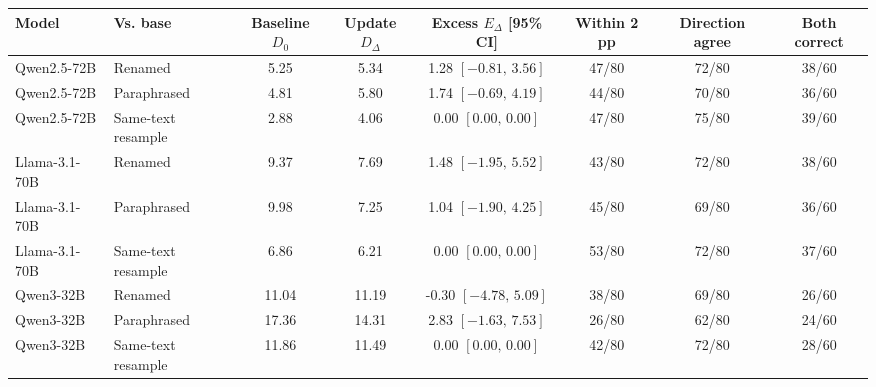 \begin{tabular}{@{}llcccccc@{}}
\toprule
Model & Vs. base & Baseline $D_0$ & Update $D_\Delta$ & Excess $E_\Delta$ [95\% CI] & Within 2 pp & Direction agree & Both correct \\
\midrule
Qwen2.5-72B & Renamed & 5.25 & 5.34 & 1.28 $[-0.81,\,3.56]$ & 47/80 & 72/80 & 38/60 \\
Qwen2.5-72B & Paraphrased & 4.81 & 5.80 & 1.74 $[-0.69,\,4.19]$ & 44/80 & 70/80 & 36/60 \\
Qwen2.5-72B & Same-text resample & 2.88 & 4.06 & 0.00 $[0.00,\,0.00]$ & 47/80 & 75/80 & 39/60 \\
Llama-3.1-70B & Renamed & 9.37 & 7.69 & 1.48 $[-1.95,\,5.52]$ & 43/80 & 72/80 & 38/60 \\
Llama-3.1-70B & Paraphrased & 9.98 & 7.25 & 1.04 $[-1.90,\,4.25]$ & 45/80 & 69/80 & 36/60 \\
Llama-3.1-70B & Same-text resample & 6.86 & 6.21 & 0.00 $[0.00,\,0.00]$ & 53/80 & 72/80 & 37/60 \\
Qwen3-32B & Renamed & 11.04 & 11.19 & -0.30 $[-4.78,\,5.09]$ & 38/80 & 69/80 & 26/60 \\
Qwen3-32B & Paraphrased & 17.36 & 14.31 & 2.83 $[-1.63,\,7.53]$ & 26/80 & 62/80 & 24/60 \\
Qwen3-32B & Same-text resample & 11.86 & 11.49 & 0.00 $[0.00,\,0.00]$ & 42/80 & 72/80 & 28/60 \\
\bottomrule
\end{tabular}
